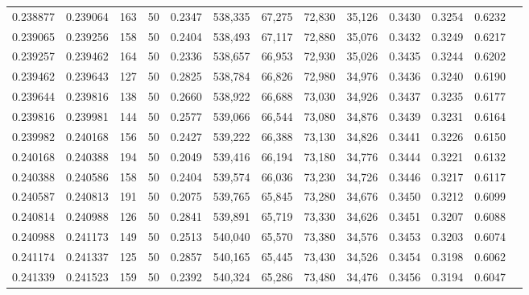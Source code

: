 \begin{tabular}{rrrrrrrrrrrrr}
0.238877 & 0.239064 &   163 &  50 &                                     0.2347 & 538,335 &  67,275 &  72,830 &  35,126 & 0.3430 & 0.3254 & 0.6232 \\
0.239065 & 0.239256 &   158 &  50 &                                     0.2404 & 538,493 &  67,117 &  72,880 &  35,076 & 0.3432 & 0.3249 & 0.6217 \\
0.239257 & 0.239462 &   164 &  50 &                                     0.2336 & 538,657 &  66,953 &  72,930 &  35,026 & 0.3435 & 0.3244 & 0.6202 \\
0.239462 & 0.239643 &   127 &  50 &                                     0.2825 & 538,784 &  66,826 &  72,980 &  34,976 & 0.3436 & 0.3240 & 0.6190 \\
0.239644 & 0.239816 &   138 &  50 &                                     0.2660 & 538,922 &  66,688 &  73,030 &  34,926 & 0.3437 & 0.3235 & 0.6177 \\
0.239816 & 0.239981 &   144 &  50 &                                     0.2577 & 539,066 &  66,544 &  73,080 &  34,876 & 0.3439 & 0.3231 & 0.6164 \\
0.239982 & 0.240168 &   156 &  50 &                                     0.2427 & 539,222 &  66,388 &  73,130 &  34,826 & 0.3441 & 0.3226 & 0.6150 \\
0.240168 & 0.240388 &   194 &  50 &                                     0.2049 & 539,416 &  66,194 &  73,180 &  34,776 & 0.3444 & 0.3221 & 0.6132 \\
0.240388 & 0.240586 &   158 &  50 &                                     0.2404 & 539,574 &  66,036 &  73,230 &  34,726 & 0.3446 & 0.3217 & 0.6117 \\
0.240587 & 0.240813 &   191 &  50 &                                     0.2075 & 539,765 &  65,845 &  73,280 &  34,676 & 0.3450 & 0.3212 & 0.6099 \\
0.240814 & 0.240988 &   126 &  50 &                                     0.2841 & 539,891 &  65,719 &  73,330 &  34,626 & 0.3451 & 0.3207 & 0.6088 \\
0.240988 & 0.241173 &   149 &  50 &                                     0.2513 & 540,040 &  65,570 &  73,380 &  34,576 & 0.3453 & 0.3203 & 0.6074 \\
0.241174 & 0.241337 &   125 &  50 &                                     0.2857 & 540,165 &  65,445 &  73,430 &  34,526 & 0.3454 & 0.3198 & 0.6062 \\
0.241339 & 0.241523 &   159 &  50 &                                     0.2392 & 540,324 &  65,286 &  73,480 &  34,476 & 0.3456 & 0.3194 & 0.6047 \\

\end{tabular}
